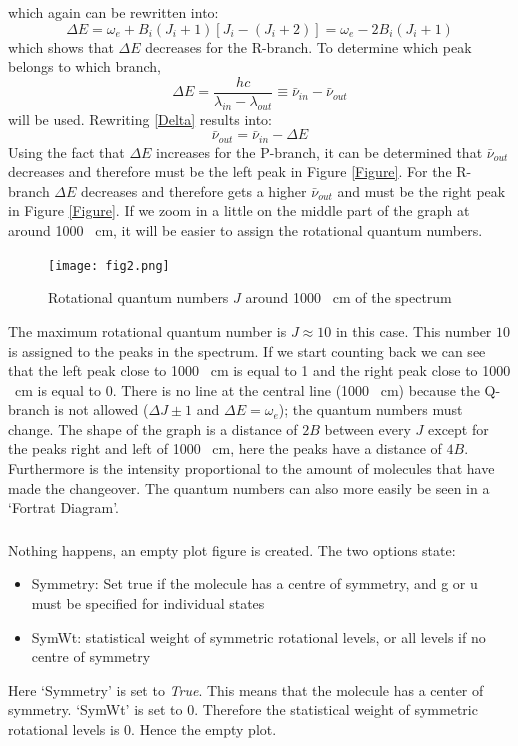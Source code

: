 which again can be rewritten into:
\begin{equation}
	\Delta E = \omega_e +B_i (J_i +1) \left[ J_i - (J_i +2) \right] = \omega_e -2 B_i (J_i +1)
\end{equation}
which shows that $\Delta E$ decreases for the R-branch. 
To determine which peak belongs to which branch, 
\begin{equation} \label{Delta}
\Delta E = \frac{h c}{\lambda_{in} - \lambda_{out}} \equiv \bar{\nu}_{in} - \bar{\nu}_{out}
\end{equation}
will be used. Rewriting \eqref{Delta} results into:
\begin{equation}
	\bar{\nu}_{out} = \bar{\nu}_{in} -\Delta E
\end{equation}
Using the fact that $\Delta E$ increases for the P-branch, it can be determined that $\bar{\nu}_{out}$ decreases and therefore must be the left peak in Figure \ref{Figure}. For the R-branch $\Delta E$ decreases and therefore gets a higher $\bar{\nu}_{out}$ and must be the right peak in Figure \ref{Figure}. If we zoom in a little on the middle part of the graph at around 1000 \si{\per\cm}, it will be easier to assign the rotational quantum numbers. 
\begin{figure}[H]
	\centering 
	\texttt{[image: fig2.png]}
	\caption{Rotational quantum numbers $J$ around 1000 \si{\per\cm} of the spectrum}
\end{figure} 

The maximum rotational quantum number is $J\approx10$ in this case. This number $10$ is assigned to the peaks in the spectrum. If we start counting back we can see that the left peak close to 1000 \si{\per\cm} is equal to 1 and the right peak close to 1000 \si{\per\cm} is equal to 0. There is no line at the central line (1000 \si{\per \cm}) because the Q-branch is not allowed ($\Delta J \pm 1$ and $\Delta E = \omega_e$); the quantum numbers must change. The shape of the graph is a distance of $2B$ between every $J$ except for the peaks right and left of 1000 \si{\per\cm}, here the peaks have a distance of $4B$. Furthermore is the intensity  proportional to the amount of molecules that have made the changeover. The quantum numbers can also more easily be seen in a `Fortrat Diagram'.

\subsubsection{}  
Nothing happens, an empty plot figure is created. The two options state:
\begin{itemize}
\item Symmetry: Set true if the molecule has a centre of symmetry, and g or u must be specified for individual states 
\item  SymWt: statistical weight of symmetric rotational levels, or all levels if no centre of symmetry 
\end{itemize} 
Here `Symmetry' is set to \textit{True}. This means that the molecule has a center of symmetry. `SymWt' is set to 0. Therefore the statistical weight of symmetric rotational levels is 0. Hence the empty plot.


